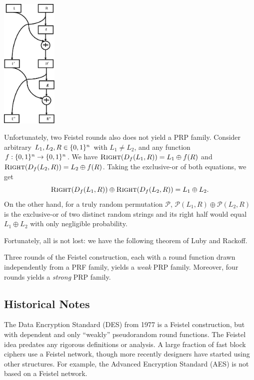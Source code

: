 \documentclass[11pt]{article}
\begin{document}
\begin{center}
  \centering
  \includegraphics[width=0.20\textwidth]{feistel2.png}
  \label{fig:feistel_2_pic}
\end{center}

Unfortunately, two Feistel rounds also does not yield a PRP family.
Consider arbitrary $L_1, L_2, R \in \{0,1\}^n$ with $L_{1} \neq L_{2}$,
and any function $f : \{0,1\}^n \rightarrow \{0,1\}^n$.  We have
$\textsc{Right}( D_f(L_1,R) ) = L_1\oplus f(R) $ and
$\textsc{Right}(D_f(L_2,R) ) = L_2\oplus f(R)$.  Taking the
exclusive-or of both equations, we get \[ \textsc{Right}( D_f(L_1,R))
\oplus \textsc{Right}( D_f(L_2,R)) = L_1 \oplus L_2. \] On the other
hand, for a truly random permutation $\mathcal P$, $\mathcal P(L_1,R)
\oplus \mathcal P(L_2, R)$ is the exclusive-or of two distinct random
strings and its right half would equal $L_1\oplus L_2$ with only
negligible probability.

Fortunately, all is not lost: we have the following theorem of Luby
and Rackoff.

\begin{theorem}
  \label{thm:luby-rackoff}
  Three rounds of the Feistel construction, each with a round function
  drawn independently from a  PRF family, yields a \emph{weak} PRP
  family.  Moreover, four rounds yields a \emph{strong} PRP family.
\end{theorem}

\subsection{Historical Notes}
\label{sec:historical-notes}

The Data Encryption Standard (DES) from 1977 is a Feistel
construction, but with dependent and only ``weakly'' pseudorandom
round functions.  The Feistel idea predates any rigorous definitions
or analysis.  A large fraction of fast block ciphers use a Feistel
network, though more recently designers have started using other
structures.  For example, the Advanced Encryption Standard (AES) is
not based on a Feistel network.
\end{document}
